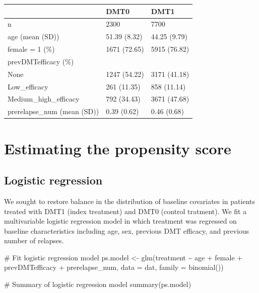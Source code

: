 \documentclass[
  letterpaper,
  DIV=11,
  numbers=noendperiod]{scrreprt}
\newenvironment{Shaded}{\begin{snugshade}}{\end{snugshade}}
\newcommand{\AttributeTok}[1]{\textcolor[rgb]{0.40,0.45,0.13}{#1}}
\newcommand{\CommentTok}[1]{\textcolor[rgb]{0.37,0.37,0.37}{#1}}
\newcommand{\FunctionTok}[1]{\textcolor[rgb]{0.28,0.35,0.67}{#1}}
\newcommand{\NormalTok}[1]{\textcolor[rgb]{0.00,0.23,0.31}{#1}}
\newcommand{\OtherTok}[1]{\textcolor[rgb]{0.00,0.23,0.31}{#1}}
\newcommand{\SpecialCharTok}[1]{\textcolor[rgb]{0.37,0.37,0.37}{#1}}
\begin{document}
\begin{longtable}[]{@{}lll@{}}
\toprule\noalign{}
& DMT0 & DMT1 \\
\midrule\noalign{}
\endhead
\bottomrule\noalign{}
\endlastfoot
n & 2300 & 7700 \\
age (mean (SD)) & 51.39 (8.32) & 44.25 (9.79) \\
female = 1 (\%) & 1671 (72.65) & 5915 (76.82) \\
prevDMTefficacy (\%) & & \\
None & 1247 (54.22) & 3171 (41.18) \\
Low\_efficacy & 261 (11.35) & 858 (11.14) \\
Medium\_high\_efficacy & 792 (34.43) & 3671 (47.68) \\
prerelapse\_num (mean (SD)) & 0.39 (0.62) & 0.46 (0.68) \\
\end{longtable}

\hypertarget{estimating-the-propensity-score}{%
\section{Estimating the propensity
score}\label{estimating-the-propensity-score}}

\hypertarget{logistic-regression}{%
\subsection{Logistic regression}\label{logistic-regression}}

We sought to restore balance in the distribution of baseline covariates
in patients treated with DMT1 (index treatment) and DMT0 (control
tratment). We fit a multivariable logistic regression model in which
treatment was regressed on baseline characteristics including age, sex,
previous DMT efficacy, and previous number of relapses.

\begin{Shaded}
\begin{Highlighting}[]
\CommentTok{\# Fit logistic regression model}
\NormalTok{ps.model }\OtherTok{\textless{}{-}} \FunctionTok{glm}\NormalTok{(treatment }\SpecialCharTok{\textasciitilde{}}\NormalTok{ age }\SpecialCharTok{+}\NormalTok{ female }\SpecialCharTok{+}\NormalTok{ prevDMTefficacy }\SpecialCharTok{+}\NormalTok{ prerelapse\_num, }
                \AttributeTok{data =}\NormalTok{ dat, }\AttributeTok{family =} \FunctionTok{binomial}\NormalTok{())}

\CommentTok{\# Summary of logistic regression model}
\FunctionTok{summary}\NormalTok{(ps.model)}
\end{Highlighting}
\end{Shaded}
\end{document}

